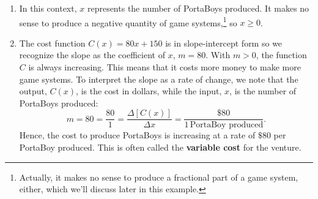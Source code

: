 \documentclass{ximera}
\begin{document}
\begin{example}
\begin{enumerate}
\begin{center}


\end{center}

\item   In this context, $x$ represents the number of PortaBoys produced.  It makes no sense to produce a negative quantity of game systems,\footnote{Actually, it makes no sense to produce a fractional part of a game system, either, which we'll discuss later in this example.}  so $x \geq 0$.


\item  The cost function $C(x)= 80x + 150$ is in slope-intercept form so we recognize the slope as the coefficient of $x$, $m = 80$.  With $m > 0$, the function $C$ is always increasing.  This means that it costs more money to make more game systems.  To interpret the slope as a rate of change, we note that the output, $C(x)$, is the cost in dollars, while the input, $x$,  is the number of PortaBoys produced:  \[ m = 80 = \dfrac{80}{1} =  \dfrac{\Delta [C(x)]}{\Delta x} = \dfrac{\$ 80}{1 \, \mbox{PortaBoy produced}}.\]  Hence, the cost to produce PortaBoys is increasing at a rate of $\$80$ per PortaBoy produced.  This is often called the \textbf{variable cost} for the venture. 



\end{enumerate}
\end{example}
\end{document}
